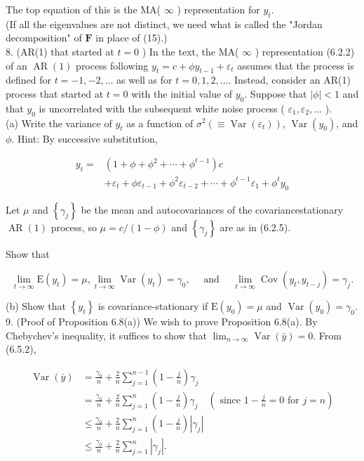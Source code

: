 \documentclass[10pt]{article}
\begin{document}
The top equation of this is the MA( $\infty$ ) representation for $y_{t}$.\\
(If all the eigenvalues are not distinct, we need what is called the "Jordan decomposition" of $\mathbf{F}$ in place of (15).)\\
8. (AR(1) that started at $t=0$ ) In the text, the MA( $\infty$ ) representation (6.2.2) of an $\operatorname{AR}(1)$ process following $y_{t}=c+\phi y_{t-1}+\varepsilon_{t}$ assumes that the process is defined for $t=-1,-2, \ldots$ as well as for $t=0,1,2, \ldots$. Instead, consider an AR(1) process that started at $t=0$ with the initial value of $y_{0}$. Suppose that $|\phi|<1$ and that $y_{0}$ is uncorrelated with the subsequent white noise process ( $\varepsilon_{1}, \varepsilon_{2}, \ldots$ ).\\
(a) Write the variance of $y_{t}$ as a function of $\sigma^{2}\left(\equiv \operatorname{Var}\left(\varepsilon_{t}\right)\right)$, $\operatorname{Var}\left(y_{0}\right)$, and $\phi$. Hint: By successive substitution,

$$
\begin{aligned}
y_{t}= & \left(1+\phi+\phi^{2}+\cdots+\phi^{t-1}\right) c \\
& +\varepsilon_{t}+\phi \varepsilon_{t-1}+\phi^{2} \varepsilon_{t-2}+\cdots+\phi^{t-1} \varepsilon_{1}+\phi^{t} y_{0}
\end{aligned}
$$

Let $\mu$ and $\left\{\gamma_{j}\right\}$ be the mean and autocovariances of the covariancestationary $\operatorname{AR}(1)$ process, so $\mu=c /(1-\phi)$ and $\left\{\gamma_{j}\right\}$ are as in (6.2.5).

Show that

$$
\lim _{t \rightarrow \infty} \mathrm{E}\left(y_{t}\right)=\mu, \lim _{t \rightarrow \infty} \operatorname{Var}\left(y_{t}\right)=\gamma_{0}, \quad \text { and } \quad \lim _{t \rightarrow \infty} \operatorname{Cov}\left(y_{t}, y_{t-j}\right)=\gamma_{j} .
$$

(b) Show that $\left\{y_{t}\right\}$ is covariance-stationary if $\mathrm{E}\left(y_{0}\right)=\mu$ and $\operatorname{Var}\left(y_{0}\right)=\gamma_{0}$.\\
9. (Proof of Proposition 6.8(a)) We wish to prove Proposition 6.8(a). By Chebychev's inequality, it suffices to show that $\lim _{n \rightarrow \infty} \operatorname{Var}(\bar{y})=0$. From (6.5.2),

$$
\begin{aligned}
\operatorname{Var}(\bar{y}) & =\frac{\gamma_{0}}{n}+\frac{2}{n} \sum_{j=1}^{n-1}\left(1-\frac{j}{n}\right) \gamma_{j} \\
& =\frac{\gamma_{0}}{n}+\frac{2}{n} \sum_{j=1}^{n}\left(1-\frac{j}{n}\right) \gamma_{j} \quad\left(\text { since } 1-\frac{j}{n}=0 \text { for } j=n\right) \\
& \leq \frac{\gamma_{0}}{n}+\frac{2}{n} \sum_{j=1}^{n}\left(1-\frac{j}{n}\right)\left|\gamma_{j}\right| \\
& \leq \frac{\gamma_{0}}{n}+\frac{2}{n} \sum_{j=1}^{n}\left|\gamma_{j}\right| .
\end{aligned}
$$
\end{document}
